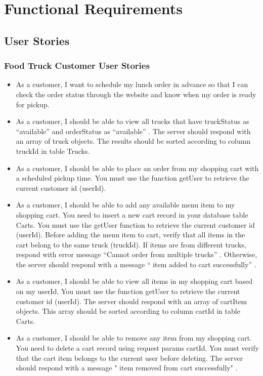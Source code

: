 \documentclass[12pt,a4paper]{article}
\begin{document}
\newpage

\section{Functional Requirements}

\subsection{User Stories}

\subsubsection{Food Truck Customer User Stories}
\begin{storybox}
\begin{itemize}[leftmargin=1em, itemsep=6pt]
    \item As a customer, I want to schedule my lunch order in advance so that I can check the order status through the website and know when my order is ready for pickup.
    \item As a customer, I should be able to view all trucks that have truckStatus as “available” and orderStatus as “available” . The server should respond with an array of truck objects. The results should be sorted according to column truckId in table Trucks.
    \item As a customer, I should be able to place an order from my shopping cart with a scheduled pickup time. You must use the function getUser to retrieve the current customer id (userId).
    \item As a customer, I should be able to add any available menu item to my shopping cart. You need to insert a new cart record in your database table Carts. You must use the getUser function to retrieve the current customer id (userId). Before adding the menu item to cart, verify that all items in the cart belong to the same truck (truckId). If items are from different trucks, respond with error message “Cannot order from multiple trucks” . Otherwise, the server should respond with a message “ item added to cart successfully” .
    \item As a customer, I should be able to view all items in my shopping cart based on my userId. You must use the function getUser to retrieve the current customer id (userId). The server should respond with an array of cartItem objects. This array should be sorted according to column cartId in table Carts.
    \item As a customer, I should be able to remove any item from my shopping cart. You need to delete a cart record using request params cartId. You must verify that the cart item belongs to the current user before deleting. The server should respond with a message " item removed from cart successfully" .
\end{itemize}
\end{storybox}
\end{document}
